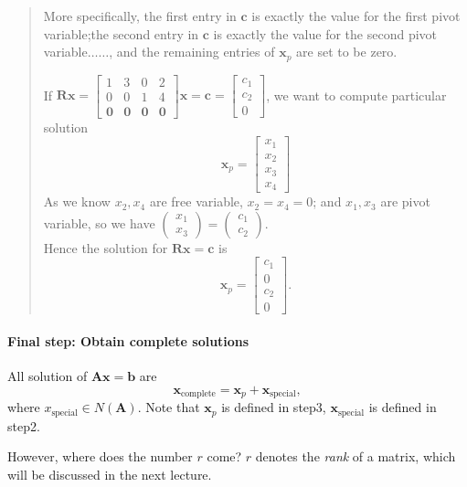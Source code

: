 \begin{quotation}
\begin{itemize}
More specifically, the first entry in $\bm c$ is exactly the value for the first pivot variable;the second entry in $\bm c$ is exactly the value for the second pivot variable$\dots\dots$, and the remaining entries of $\bm x_p$ are set to be zero.
\begin{example}
If $\bm{Rx} = \begin{bmatrix}
1&3&0&2\\0&0&1&4\\\bm 0&\bm 0&\bm 0&\bm 0
\end{bmatrix}\bm x = \bm c = \begin{bmatrix}
c_1\\c_2\\0
\end{bmatrix}$, we want to compute particular solution 
\[\bm x_p = \begin{bmatrix}
x_1\\x_2\\x_3\\x_4
\end{bmatrix}\]
As we know $x_2,x_4$ are free variable, $x_2=x_4=0$; and $x_1,x_3$ are pivot variable, so we have $\begin{pmatrix}
x_1\\x_3
\end{pmatrix} = \begin{pmatrix}
c_1\\c_2
\end{pmatrix}$.\\
Hence the solution for $\bm{Rx} = \bm c$ is 
\[
\bm x_p=
\begin{bmatrix}
c_1\\0\\c_2\\0
\end{bmatrix}.
\]
\end{example}
\end{itemize}
\end{quotation}
\paragraph{Final step: Obtain complete solutions}
All solution of $\bm{Ax} = \bm b$ are 
\[
\bm x_{\text{complete}} = \bm x_p + \bm x_{\text{special}},
\] 
where $x_{\text{special}}\in N(\bm A)$. Note that $\bm x_p$ is defined in step3, $\bm x_{\text{special}}$ is defined in step2.

However, where does the number $r$ come? $r$ denotes the \emph{rank} of a matrix, which will be discussed in the next lecture.




















